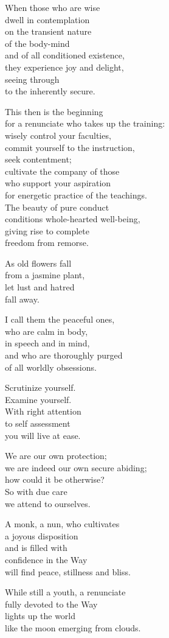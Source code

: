 When those who are wise\\
dwell in contemplation\\
on the transient nature\\
of the body-mind\\
and of all conditioned existence,\\
they experience joy and delight,\\
seeing through\\
to the inherently secure.


This then is the beginning\\
for a renunciate who takes up the training:\\
wisely control your faculties,\\
commit yourself to the instruction,\\
seek contentment;\\
cultivate the company of those\\
who support your aspiration\\
for energetic practice of the teachings.\\
The beauty of pure conduct\\
conditions whole-hearted well-being,\\
giving rise to complete\\
freedom from remorse.


As old flowers fall\\
from a jasmine plant,\\
let lust and hatred\\
fall away.


I call them the peaceful ones,\\
who are calm in body,\\
in speech and in mind,\\
and who are thoroughly purged\\
of all worldly obsessions.


Scrutinize yourself.\\
Examine yourself.\\
With right attention\\
to self assessment\\
you will live at ease.


We are our own protection;\\
we are indeed our own secure abiding;\\
how could it be otherwise?\\
So with due care\\
we attend to ourselves.


A monk, a nun, who cultivates\\
a joyous disposition\\
and is filled with\\
confidence in the Way\\
will find peace, stillness and bliss.


While still a youth, a renunciate\\
fully devoted to the Way\\
lights up the world\\
like the moon emerging from clouds.

